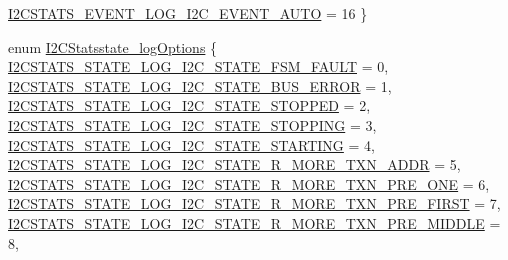 \begin{DoxyCompactItemize}
\*
\hyperlink{group___i2_c_stats_ggae803cac254ef7e0b2d08ebcc3578241aa83fe0b9c5e8781c0230ee886a558f040}{\-I2\-C\-S\-T\-A\-T\-S\-\_\-\-E\-V\-E\-N\-T\-\_\-\-L\-O\-G\-\_\-\-I2\-C\-\_\-\-E\-V\-E\-N\-T\-\_\-\-A\-U\-T\-O} = 16
 \}
\item 
enum \hyperlink{group___i2_c_stats_ga7114dd470965b817edccf7e3afb2f457}{\-I2\-C\-Statsstate\-\_\-log\-Options} \{ \*
\hyperlink{group___i2_c_stats_gga7114dd470965b817edccf7e3afb2f457a7b48f86ef4f4920cc760b2c187f461b8}{\-I2\-C\-S\-T\-A\-T\-S\-\_\-\-S\-T\-A\-T\-E\-\_\-\-L\-O\-G\-\_\-\-I2\-C\-\_\-\-S\-T\-A\-T\-E\-\_\-\-F\-S\-M\-\_\-\-F\-A\-U\-L\-T} = 0, 
\hyperlink{group___i2_c_stats_gga7114dd470965b817edccf7e3afb2f457a5319aa89dc8d3ebf06a6ecdf73ffa0ed}{\-I2\-C\-S\-T\-A\-T\-S\-\_\-\-S\-T\-A\-T\-E\-\_\-\-L\-O\-G\-\_\-\-I2\-C\-\_\-\-S\-T\-A\-T\-E\-\_\-\-B\-U\-S\-\_\-\-E\-R\-R\-O\-R} = 1, 
\hyperlink{group___i2_c_stats_gga7114dd470965b817edccf7e3afb2f457a4c75aefcaaba81586aebc47c6e297ee0}{\-I2\-C\-S\-T\-A\-T\-S\-\_\-\-S\-T\-A\-T\-E\-\_\-\-L\-O\-G\-\_\-\-I2\-C\-\_\-\-S\-T\-A\-T\-E\-\_\-\-S\-T\-O\-P\-P\-E\-D} = 2, 
\hyperlink{group___i2_c_stats_gga7114dd470965b817edccf7e3afb2f457a1fe868555ad7a1dd2153d6729dcd29e2}{\-I2\-C\-S\-T\-A\-T\-S\-\_\-\-S\-T\-A\-T\-E\-\_\-\-L\-O\-G\-\_\-\-I2\-C\-\_\-\-S\-T\-A\-T\-E\-\_\-\-S\-T\-O\-P\-P\-I\-N\-G} = 3, 
\*
\hyperlink{group___i2_c_stats_gga7114dd470965b817edccf7e3afb2f457ab17b05b4d37c4d99f5eb22fa9cba313e}{\-I2\-C\-S\-T\-A\-T\-S\-\_\-\-S\-T\-A\-T\-E\-\_\-\-L\-O\-G\-\_\-\-I2\-C\-\_\-\-S\-T\-A\-T\-E\-\_\-\-S\-T\-A\-R\-T\-I\-N\-G} = 4, 
\hyperlink{group___i2_c_stats_gga7114dd470965b817edccf7e3afb2f457a19dff9ee0d43ec2362705245c7fe7d89}{\-I2\-C\-S\-T\-A\-T\-S\-\_\-\-S\-T\-A\-T\-E\-\_\-\-L\-O\-G\-\_\-\-I2\-C\-\_\-\-S\-T\-A\-T\-E\-\_\-\-R\-\_\-\-M\-O\-R\-E\-\_\-\-T\-X\-N\-\_\-\-A\-D\-D\-R} = 5, 
\hyperlink{group___i2_c_stats_gga7114dd470965b817edccf7e3afb2f457a9c8208eb9dc77ea6ce3c07d6e92c9953}{\-I2\-C\-S\-T\-A\-T\-S\-\_\-\-S\-T\-A\-T\-E\-\_\-\-L\-O\-G\-\_\-\-I2\-C\-\_\-\-S\-T\-A\-T\-E\-\_\-\-R\-\_\-\-M\-O\-R\-E\-\_\-\-T\-X\-N\-\_\-\-P\-R\-E\-\_\-\-O\-N\-E} = 6, 
\hyperlink{group___i2_c_stats_gga7114dd470965b817edccf7e3afb2f457afb6a22ba9b1228fc522d98d4ce92aed9}{\-I2\-C\-S\-T\-A\-T\-S\-\_\-\-S\-T\-A\-T\-E\-\_\-\-L\-O\-G\-\_\-\-I2\-C\-\_\-\-S\-T\-A\-T\-E\-\_\-\-R\-\_\-\-M\-O\-R\-E\-\_\-\-T\-X\-N\-\_\-\-P\-R\-E\-\_\-\-F\-I\-R\-S\-T} = 7, 
\*
\hyperlink{group___i2_c_stats_gga7114dd470965b817edccf7e3afb2f457a69cf92b51ea61868a8a411113472a5ba}{\-I2\-C\-S\-T\-A\-T\-S\-\_\-\-S\-T\-A\-T\-E\-\_\-\-L\-O\-G\-\_\-\-I2\-C\-\_\-\-S\-T\-A\-T\-E\-\_\-\-R\-\_\-\-M\-O\-R\-E\-\_\-\-T\-X\-N\-\_\-\-P\-R\-E\-\_\-\-M\-I\-D\-D\-L\-E} = 8, 

\end{DoxyCompactItemize}

